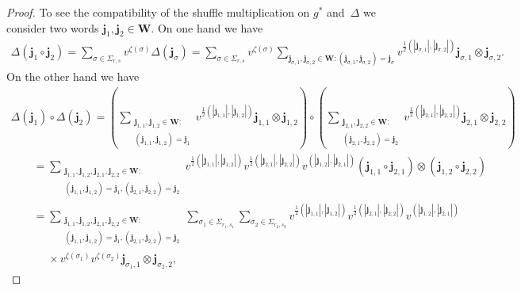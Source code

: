 \begin{proof}
To see the compatibility of the shuf\/f\/le multiplication on $g^*$ and~$\Delta$ we consider two words
$\mathbf{j}_1,\mathbf{j}_2\in\mathbf{W}$.
On one hand we have
\begin{gather*}
\Delta(\mathbf{j}_1\circ\mathbf{j}_2)=\sum\limits_{\sigma\in\Sigma_{r,s}}v^{\zeta(\sigma)}\Delta(\mathbf{j}_\sigma)
=\sum\limits_{\sigma\in\Sigma_{r,s}}v^{\zeta(\sigma)}
\sum\limits_{\mathbf{j}_{\sigma,1},\mathbf{j}_{\sigma,2}\in\mathbf{W}:(\mathbf{j}_{\sigma,1},\mathbf{j}_{\sigma,2})=\mathbf{j}_\sigma}
v^{\frac{1}{2}(|\mathbf{j}_{\sigma,1}|,|\mathbf{j}_{\sigma,2}|)}\mathbf{j}_{\sigma,1}\otimes\mathbf{j}_{\sigma,2}.
\end{gather*}
On the other hand we have
\begin{gather*}
\Delta(\mathbf{j}_1)\circ\Delta(\mathbf{j}_2)
=\left(\sum\limits_{\substack{\mathbf{j}_{1,1},\mathbf{j}_{1,2}\in\mathbf{W}:\\(\mathbf{j}_{1,1},\mathbf{j}_{1,2})=\mathbf{j}_1}}
v^{\frac{1}{2}(|\mathbf{j}_{1,1}|,|\mathbf{j}_{1,2}|)}\mathbf{j}_{1,1}\otimes\mathbf{j}_{1,2}\right)\!
\circ\!\left(\sum\limits_{\substack{\mathbf{j}_{2,1},\mathbf{j}_{2,2}\in\mathbf{W}:\\(\mathbf{j}_{2,1},\mathbf{j}_{2,2})=\mathbf{j}_2}}
v^{\frac{1}{2}(|\mathbf{j}_{2,1}|,|\mathbf{j}_{2,2}|)}\mathbf{j}_{2,1}\otimes\mathbf{j}_{2,2}\right)
\\
\qquad
=\sum\limits_{\substack{\mathbf{j}_{1,1},\mathbf{j}_{1,2},\mathbf{j}_{2,1},\mathbf{j}_{2,2}\in\mathbf{W}:\\
(\mathbf{j}_{1,1},\mathbf{j}_{1,2})=\mathbf{j}_1,(\mathbf{j}_{2,1},\mathbf{j}_{2,2})=\mathbf{j}_2}}
v^{\frac{1}{2}(|\mathbf{j}_{1,1}|,|\mathbf{j}_{1,2}|)}v^{\frac{1}{2}(|\mathbf{j}_{2,1}|,|\mathbf{j}_{2,2}|)}
v^{(|\mathbf{j}_{1,2}|,|\mathbf{j}_{2,1}|)}(\mathbf{j}_{1,1}\circ\mathbf{j}_{2,1})\otimes(\mathbf{j}_{1,2}\circ\mathbf{j}_{2,2})
\\
\qquad
=\sum\limits_{\substack{\mathbf{j}_{1,1},\mathbf{j}_{1,2},\mathbf{j}_{2,1},\mathbf{j}_{2,2}\in\mathbf{W}:\\
(\mathbf{j}_{1,1},\mathbf{j}_{1,2})=\mathbf{j}_1,(\mathbf{j}_{2,1},\mathbf{j}_{2,2})=\mathbf{j}_2}}
\sum\limits_{\sigma_1\in\Sigma_{r_1,s_1}}
\sum\limits_{\sigma_2\in\Sigma_{r_2,s_2}}v^{\frac{1}{2}(|\mathbf{j}_{1,1}|,|\mathbf{j}_{1,2}|)}
v^{\frac{1}{2}(|\mathbf{j}_{2,1}|,|\mathbf{j}_{2,2}|)}v^{(|\mathbf{j}_{1,2}|,|\mathbf{j}_{2,1}|)}
\\
\qquad\phantom{=}  \times
v^{\zeta(\sigma_1)}v^{\zeta(\sigma_2)}\mathbf{j}_{\sigma_1,1}\otimes\mathbf{j}_{\sigma_2,2},

\end{gather*}
\end{proof}
